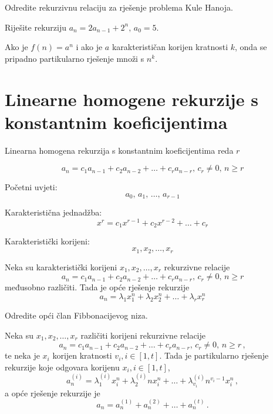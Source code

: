 \begin{problem}
    Odredite rekurzivnu relaciju za rješenje problema Kule Hanoja.
\end{problem}

\begin{problem}
    Riješite rekurziju $a_n = 2a_{n-1}+2^n,\, a_0 = 5$.
\end{problem}

Ako je $f(n) = a^n$ i ako je $a$ karakterističan korijen kratnosti $k$, onda se pripadno partikularno rješenje množi s $n^k$.

\section{Linearne homogene rekurzije s konstantnim koeficijentima}

Linearna homogena rekurzija s konstantnim koeficijentima reda $r$

$$
    a_n = c_1a_{n-1}+c_2a_{n-2}+\dots+c_ra_{n-r},\, c_r \neq 0,\, n \geq r
$$

Početni uvjeti:
$$
a_0,\, a_1,\, \dots,\, a_{r-1}
$$

Karakteristična jednadžba:
$$
x^r = c_1x^{r-1}+c_2x^{r-2}+\dots+c_r
$$

Karakteristički korijeni:
$$
x_1,x_2,\dots,x_r
$$

\begin{theorem}
    Neka su karakteristički korijeni $x_1,x_2,\dots,x_r$ rekurzivne relacije
    $$
        a_n = c_1a_{n-1}+c_2a_{n-2}+\dots+c_ra_{n-r},\, c_r \neq 0,\, n \geq r
    $$
    međusobno različiti. Tada je opće rješenje rekurzije
    $$
        a_n = \lambda_1x_1^n+\lambda_2x_2^n+\dots+\lambda_rx_r^n
    $$
\end{theorem}

\begin{problem}
    Odredite opći član Fibbonacijevog niza.
\end{problem}

\begin{theorem}
    Neka su $x_1,x_2,\dots,x_r$ različiti korijeni rekurzivne relacije
    $$
        a_n = c_1a_{n-1}+c_2a_{n-2}+\dots+c_ra_{n-r},\, c_r \neq 0,\, n \geq r\,,
    $$
    te neka je $x_i$ korijen kratnosti $v_i, i \in [1, t]$. Tada je partikularno rješenje rekurzije koje odgovara korijenu $x_i, i \in [1, t]$,
    $$
        a_n^{(i)} = \lambda_1^{(i)}x_i^n+\lambda_2^{(i)}nx_i^n+\dots+\lambda_{v_i}^{(i)}n^{v_i-1}x_i^n\,,
    $$
    a opće rješenje rekurzije je
    $$
        a_n = a_n^{(1)}+a_n^{(2)}+\dots+a_n^{(t)}\,.
    $$
\end{theorem}

